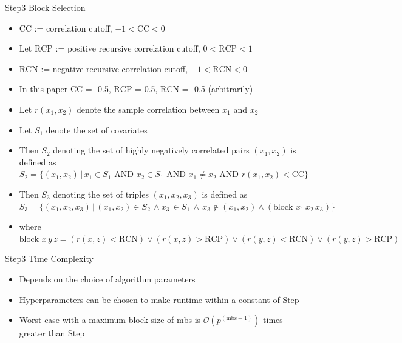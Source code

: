 \documentclass[ignorenonframetext,]{beamer}
\providecommand{\tightlist}{%
  \setlength{\itemsep}{0pt}\setlength{\parskip}{0pt}}
\begin{document}
\begin{frame}{Step3 Block Selection}

\begin{itemize}
\tightlist
\item
  \(\text{CC}\) := correlation cutoff, \(-1 < \text{CC} < 0\)
\item
  Let \(\text{RCP}\) := positive recursive correlation cutoff,
  \(0 < \text{RCP} < 1\)
\item
  \(\text{RCN}\) := negative recursive correlation cutoff,
  \(-1 < \text{RCN} < 0\)
\item
  In this paper \(\text{CC}\) = -0.5, \(\text{RCP}\) = 0.5,
  \(\text{RCN}\) = -0.5 (arbitrarily)
\item
  Let \(r(x_1,x_2)\) denote the sample correlation between \(x_1\) and
  \(x_2\)
\item
  Let \(S_1\) denote the set of covariates
\item
  Then \(S_2\) denoting the set of highly negatively correlated pairs
  \((x_1,x_2)\) is defined as
  \(S_2 = \{(x_1, x_2) \, | \, x_1 \in S_1 \text{ AND } x_2 \in S_1 \text{ AND } x_1 \neq x_2 \text{ AND } r(x_1,x_2) < \text{CC} \}\)
\item
  Then \(S_3\) denoting the set of triples \((x_1,x_2,x_3)\) is defined
  as
  \(S_3 = \{ (x_1, x_2, x_3) \, | \, (x_1,x_2) \in S_2 \, \land x_3 \, \in S_1 \, \land \, x_3 \notin (x_1, x_2) \land \left(\text{block } x_1 \, x_2 \, x_3 \right) \}\)
\item
  where
  \(\text{block } x \, y \, z = (r(x,z) < \text{RCN}) \lor (r(x,z) > \text{RCP}) \lor (r(y,z) < \text{RCN}) \lor (r(y,z) > \text{RCP})\)
\end{itemize}

\end{frame}

\begin{frame}{Step3 Time Complexity}

\begin{itemize}
\tightlist
\item
  Depends on the choice of algorithm parameters
\item
  Hyperparameters can be chosen to make runtime within a constant of
  Step
\item
  Worst case with a maximum block size of \(\text{mbs}\) is
  \(\mathcal O\left( p ^ {(\text{mbs}-1)}\right)\) times greater than
  Step
\end{itemize}

\end{frame}
\end{document}
